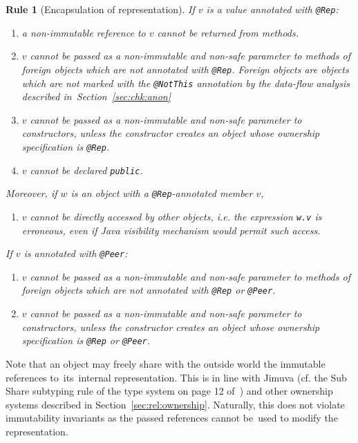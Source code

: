 \documentclass{pracamgr}
\theoremstyle{break}
\theoremstyle{break}
\theoremstyle{break}
\newtheorem{verrule}{Rule}
\begin{document}
\begin{verrule}[Encapsulation of representation]
  If $v$ is a value annotated with \texttt{@Rep}:
  \begin{enumerate}[label=(\arabic*)]
  \item a non-immutable reference to $v$ cannot be returned from
    methods.
  \item $v$ cannot be passed as a non-immutable and non-safe parameter
    to methods of fo\-reign objects which are not annotated with
    \texttt{@Rep}. Foreign objects are objects which are not marked
    with the \texttt{@NotThis} annotation by the data-flow analysis
    described in~Section~\ref{sec:chk:anon}
  \item $v$ cannot be passed as a non-immutable and non-safe parameter
    to constructors, unless the constructor creates an object whose
    ownership specification is \texttt{@Rep}.
  \item $v$ cannot be declared \texttt{public}. 
  \end{enumerate}
  Moreover, if $w$ is an object with a \texttt{@Rep}-annotated member
  $v$,
  \begin{enumerate}[label=(\arabic*), resume]
  \item $v$ cannot be directly accessed by other objects, i.e. the
    expression \texttt{w.v} is erroneous, even if Java visibility
    mechanism would permit such access.
  \end{enumerate}
  If $v$ is annotated with \texttt{@Peer}:
  \begin{enumerate}[label=(\arabic*), resume]
  \item $v$ cannot be passed as a non-immutable and non-safe parameter
    to methods of foreign objects which are not annotated with
    \texttt{@Rep} or \texttt{@Peer}.
  \item $v$ cannot be passed as a non-immutable and non-safe parameter
    to constructors, unless the constructor creates an object whose
    ownership specification is \texttt{@Rep} or \texttt{@Peer}.
  \end{enumerate}
\end{verrule}

Note that an object may freely share with the outside world the
immutable references to~its~internal representation. This is in line
with Jimuva (cf. the Sub Share subtyping rule of the type system on
page 12 of~\cite{haack}) and other ownership systems described in
Section~\ref{sec:rel:ownership}. Naturally, this does not violate
immutability invariants as the passed references cannot be~used to
modify the representation. 
\end{document}
